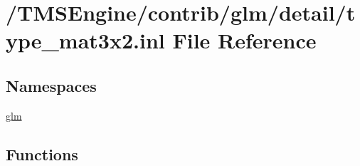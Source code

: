 \hypertarget{type__mat3x2_8inl}{}\section{/\+T\+M\+S\+Engine/contrib/glm/detail/type\+\_\+mat3x2.inl File Reference}
\label{type__mat3x2_8inl}
\subsection*{Namespaces}
\begin{DoxyCompactItemize}
\item 
 \hyperlink{namespaceglm}{glm}
\end{DoxyCompactItemize}
\subsection*{Functions}
